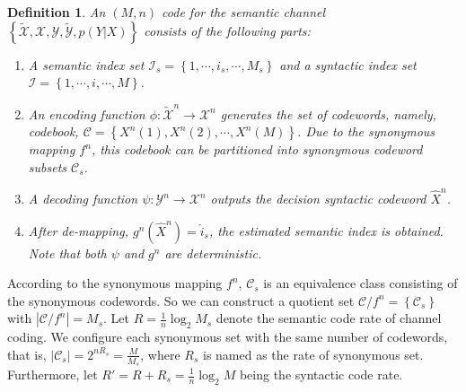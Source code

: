 \documentclass[12pt, draftclsnofoot,onecolumn]{IEEEtran}
\newtheorem{definition}{\bf{Definition}}
\begin{document}
\begin{definition}
An $\left(M,n\right)$ code for the semantic channel $\left\{\tilde{\mathcal{X}},\mathcal{X},\mathcal{Y},\tilde{\mathcal{Y}}, p(Y|X)\right\}$ consists of the following parts:
\begin{enumerate}[(1)]
   \item A semantic index set $\mathcal{I}_s=\left\{1,\cdots,i_s,\cdots, M_s\right\}$ and a syntactic index set $\mathcal{I}=\left\{1,\cdots,i,\cdots, M\right\}$.
   \item An encoding function $\phi: \tilde{\mathcal{X}}^n\to  \mathcal{X}^n$ generates the set of codewords, namely, codebook, $\mathcal{C}=\left\{X^n(1),X^n(2),\cdots,X^n(M)\right\}$. Due to the synonymous mapping $f^n$, this codebook can be partitioned into synonymous codeword subsets $\mathcal{C}_s$.
   \item A decoding function $\psi: \mathcal{Y}^n \to \mathcal{X}^n$ outputs the decision syntactic codeword $\hat{X}^n$.
   \item After de-mapping, $g^n(\hat{X}^n)=\hat{i}_s$, the estimated semantic index is obtained. Note that both $\psi$ and $g^n$ are deterministic.
\end{enumerate}
\end{definition}

According to the synonymous mapping $f^n$, $\mathcal{C}_s$ is an equivalence class consisting of the synonymous codewords. So we can construct a quotient set $\mathcal{C}/f^n=\left\{\mathcal{C}_s\right\}$ with $\left|\mathcal{C}/f^n\right|=M_s$. Let $R=\frac{1}{n}\log_2 M_s$ denote the semantic code rate of channel coding. We configure each synonymous set with the same number of codewords, that is, $\left|\mathcal{C}_s\right|=2^{nR_s}=\frac{M}{M_s}$, where $R_s$ is named as the rate of synonymous set. Furthermore, let $R'=R+R_s=\frac{1}{n}\log_2 M$ being the syntactic code rate.
\end{document}
